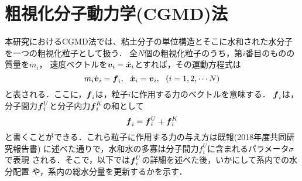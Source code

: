 ﻿%
\section{粗視化分子動力学(CGMD)法}
本研究におけるCGMD法では、粘土分子の単位構造とそこに水和された水分子を一つの粗視化粒子として扱う．
全$N$個の粗視化粒子のうち，第$i$番目のものの質量を$m_i$，
速度ベクトルを$\mbox{\boldmath $v$}_i=\dot{\mbox{\boldmath $x$}}_i$とすれば，その運動方程式は
\begin{equation}
	m_i \dot {\fat{v}}_i =\fat{f}_i ,\ \ 
	\dot{\fat{x}}_i = \fat{v}_i, \ \ ( i =1,2,\cdots N )
	\label{eqn:eq_mot}
\end{equation}
と表される．ここに，$\mbox{\boldmath $f$}_i$は，粒子$i$に作用する力のベクトルを意味する．
$\mbox{\boldmath $f$}_i$は，分子間力$\mbox{\boldmath $f$}_i^{U}$と分子内力$\mbox{\boldmath $f$}_i^{K}$の和として
\begin{equation}
	\mbox{\boldmath $f$}_i=\mbox{\boldmath $f$}_i^U+\mbox{\boldmath $f$}_i^K
	\label{eqn:f_tot}
\end{equation}
と書くことができる．これら粒子に作用する力の与え方は既報(2018年度共同研究報告書)
に述べた通りで，水和水の多寡は分子間力$f_i^U$に含まれるパラメータ$\sigma$で表現
される．そこで，以下では$\mbox{\boldmath $f$}_i^U$の詳細を述べた後，いかにして系内での水分配置
や，系内の総水分量を更新するかを示す．\\

